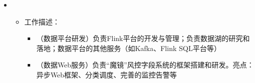   \begin{itemize}[leftmargin=*]
    \item
      {\small
      \begin{itemize}
        \item 工作描述：
        \begin{itemize}
          \item （数据平台研发）负责Flink平台的开发与管理；负责数据湖的研究和落地；数据平台的其他服务（如Kafka、Flink SQL平台等）
          \item （数据Web服务）负责“魔镜”风控字段系统的框架搭建和研发。亮点：异步Web框架、分类调度、完善的监控告警等
        \end{itemize}        
      \end{itemize}
      }
  \end{itemize}
        
